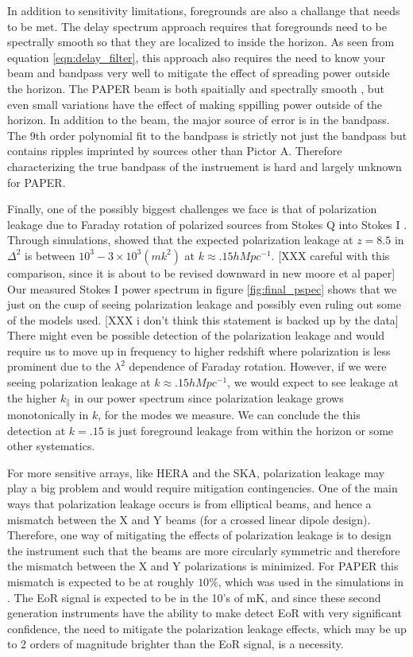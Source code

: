 \documentclass[twocolumn,numberedappendix]{emulateapj} \shorttitle{PSA64}
\begin{document}
In addition to sensitivity limitations, foregrounds are also a challange that
needs to be met. The delay spectrum approach requires that foregrounds need to
be spectrally smooth so that they are localized to inside the horizon. As seen
from equation \ref{eqn:delay_filter}, this approach also requires the need to
know your beam and bandpass very well to mitigate the effect of spreading power
outside the horizon. The PAPER beam is both spaitially and spectrally smooth
\cite{pober_et_al2012}, but even small variations have the effect of
making sppilling power outside of the horizon. In addition to the beam, the
major source of error is in the bandpass. The 9th order polynomial fit to the
bandpass is strictly not just the bandpass but contains ripples imprinted by
sources other than Pictor A. Therefore characterizing the true bandpass of the
instruement is hard and largely unknown for PAPER.

Finally, one of the possibly biggest challenges we face is that of polarization
leakage due to Faraday rotation of polarized sources from Stokes Q into Stokes
I \citep{jelic_et_al2010,jelic_et_al2014}. 
Through simulations, \cite{moore_et_al2013} showed that the expected
polarization leakage at $z=8.5$ in $\Delta^{2}$ is between
$10^{3}-3\times10^{3} (mk^{2})$ at $k\approx{.15}hMpc^{-1}$. 
[XXX careful with this comparison, since it is about to be revised downward in new moore et al paper]
Our measured Stokes
I power spectrum in figure \ref{fig:final_pspec} shows that we just on the cusp
of seeing polarization leakage and possibly even ruling out some of the models
used. [XXX i don't think this statement is backed up by the data]
There might even be possible detection of the polarization leakage and
would require us to move up in frequency to higher redshift where polarization
is less prominent due to the $\lambda^{2}$ dependence of Faraday rotation.
However, if we were seeing polarization leakage at $k\approx{.15}hMpc^{-1}$, we
would expect to see leakage at the higher $k_{\parallel}$ in our power spectrum
since polarization leakage grows monotonically in $k$, for the modes we measure.
We can conclude the this detection at $k=.15$ is just foreground leakage from
within the horizon or some other systematics.

For more sensitive arrays, like HERA and the SKA, polarization leakage may play
a big problem and would require mitigation contingencies. One of the main ways
that polarization leakage occurs is from elliptical beams, and hence a mismatch
between the X and Y beams (for a crossed linear dipole design). Therefore, one
way of mitigating the effects of polarization leakage is to design the
instrument such that the beams are more circularly symmetric and therefore the
mismatch between the X and Y polarizations is minimized. For PAPER this mismatch
is expected to be at roughly $10\%$, which was used in the simulations in
\cite{moore_et_al2013}.  The EoR signal is expected to be in the 10's of mK, and
since these second generation instruments have the ability to make detect EoR
with very significant confidence, the need to mitigate the polarization leakage
effects, which may be up to 2 orders of magnitude brighter than the EoR signal,
is a necessity.
\end{document}
